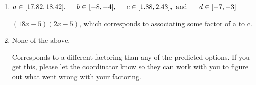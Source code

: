 \documentclass{extbook}[14pt]
\begin{document}
\begin{enumerate}
{\begin{enumerate}[label=\Alph*.]
 $(2x -5)(18x -5)$, which corresponds to associating some factor of c to a.
\item \( a \in [17.82, 18.42], \hspace*{5mm} b \in [-8, -4], \hspace*{5mm} c \in [1.88, 2.43], \text{ and } \hspace*{5mm} d \in [-7, -3] \)

 $(18x -5)(2x -5)$, which corresponds to associating some factor of a to c.
\item \( \text{None of the above.} \)

 Corresponds to a different factoring than any of the predicted options. If you get this, please let the coordinator know so they can work with you to figure out what went wrong with your factoring.
\end{enumerate}

}
\end{enumerate}
\end{document}
